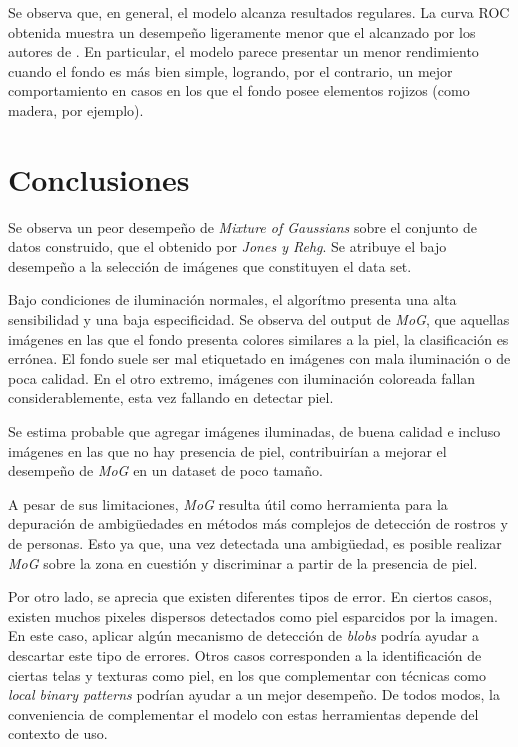 \documentclass[12pt]{article}
\begin{document}
Se observa que, en general, el modelo alcanza resultados regulares. La curva ROC
obtenida muestra un desempeño ligeramente menor que el alcanzado por los autores
de \cite{skin}. En particular, el modelo parece presentar un menor rendimiento
cuando el fondo es más bien simple, logrando, por el contrario, un mejor
comportamiento en casos en los que el fondo posee elementos rojizos (como
madera, por ejemplo). 


\section{Conclusiones}




Se observa un peor desempeño de \emph{Mixture of Gaussians} sobre el conjunto de
datos construido, que el obtenido por \emph{Jones y Rehg}.  Se atribuye el bajo
desempeño a la selección de imágenes que constituyen el data set. 

Bajo condiciones de iluminación normales, el algorítmo presenta una alta
sensibilidad y una baja especificidad.  Se observa del output de \emph{MoG}, que
aquellas imágenes en las que el fondo presenta colores similares a la piel, la
clasificación es errónea. El fondo suele ser mal etiquetado en imágenes con mala
iluminación o de poca calidad. En el otro extremo, imágenes con iluminación
coloreada fallan considerablemente, esta vez fallando en detectar piel. 

Se estima probable que agregar imágenes iluminadas, de buena calidad e incluso
imágenes en las que no hay presencia de piel, contribuirían a mejorar el
desempeño de \emph{MoG} en un dataset de poco tamaño.

A pesar de sus limitaciones, \emph{MoG} resulta útil como herramienta para la
depuración de ambigüedades en métodos más complejos de detección de rostros y de
personas. Esto ya que, una vez detectada una ambigüedad, es posible realizar
\emph{MoG} sobre la zona en cuestión y discriminar a partir de la presencia de
piel.

Por otro lado, se aprecia que existen diferentes tipos de error. En ciertos
casos, existen muchos pixeles dispersos detectados como piel esparcidos por la
imagen. En este caso, aplicar algún mecanismo de detección de \emph{blobs}
podría ayudar a descartar este tipo de errores. Otros casos corresponden a la
identificación de ciertas telas y texturas como piel, en los que complementar
con técnicas como \emph{local binary patterns} podrían ayudar a un mejor
desempeño. De todos modos, la conveniencia de complementar el modelo con estas
herramientas depende del contexto de uso.






\end{document}
